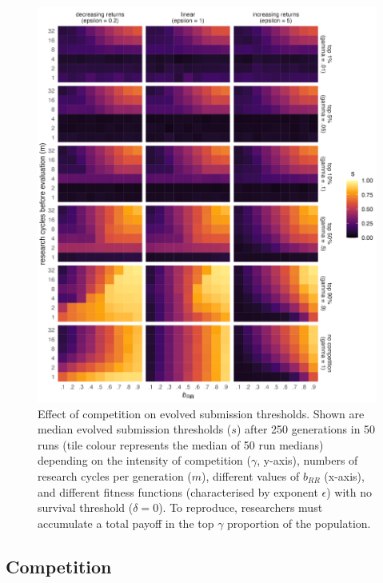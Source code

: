 \documentclass[
  ,man,mask,floatsintext]{apa6}
\begin{document}
\begin{figure}
\includegraphics[width=1\linewidth]{plots/plot_gamma_evo_epsilon_inferno} \caption{Effect of competition on evolved submission thresholds. Shown are median evolved submission thresholds (\(s\)) after 250 generations in 50 runs (tile colour represents the median of 50 run medians) depending on the intensity of competition (\(\gamma\), y-axis), numbers of research cycles per generation (\(m\)), different values of \(b_{RR}\) (x-axis), and different fitness functions (characterised by exponent \(\epsilon\)) with no survival threshold (\(\delta = 0\)). To reproduce, researchers must accumulate a total payoff in the top \(\gamma\) proportion of the population.}\label{fig:competitionplot}
\end{figure}

\hypertarget{competition}{%
\subsection{Competition}\label{competition}}
\end{document}
